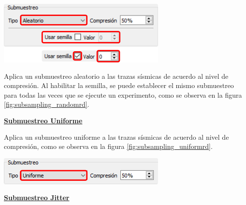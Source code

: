 \documentclass[12pt,twoside,letter]{ol-softwaremanual}
\newenvironment{Figure}
  {\par\medskip\noindent\minipage{\linewidth}}
  {\endminipage\par\medskip}
\begin{document}
\begin{multicols}{2}
	\begin{Figure}
		\centering
		\includegraphics[width=0.8\linewidth]{subsampling-random.png}
		\label{fig:subsampling_randomrd}
	\end{Figure}
	
	Aplica un submuestreo aleatorio a las trazas sísmicas de acuerdo al nivel de compresión. Al habilitar la semilla, se puede establecer el mismo submuestreo para todas las veces que se ejecute un experimento, como se observa en la figura \ref{fig:subsampling_randomrd}.
	
\end{multicols}

\underline{\textbf{Submuestreo Uniforme}}

\begin{multicols}{2}
	
	Aplica un submuestreo uniforme a las trazas sísmicas de acuerdo al nivel de compresión, como se observa en la figura \ref{fig:subsampling_uniformrd}.
	
	\begin{Figure}
		\centering
		\includegraphics[width=0.8\linewidth]{subsampling-uniform.png}
		\label{fig:subsampling_uniformrd}
	\end{Figure}
	
\end{multicols}

\underline{\textbf{Submuestreo Jitter}}
\end{document}
